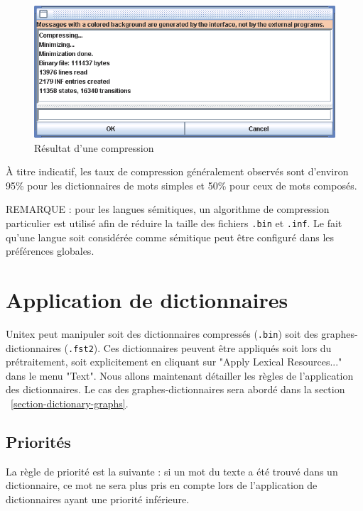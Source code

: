 \bigskip
\begin{figure}[!h]
\begin{center}
\includegraphics[width=14cm]{resources/img/fig3-11.png}
\caption{Résultat d’une compression\label{fig-compression-result}}
\end{center}
\end{figure}

\bigskip
\noindent À titre indicatif, les taux de compression généralement observés sont d’environ 95\% pour
les dictionnaires de mots simples et 50\% pour ceux de mots composés.


\bigskip
\noindent REMARQUE : pour les langues sémitiques, un algorithme de compression particulier est utilisé
afin de réduire la taille des fichiers \verb+.bin+ et \verb+.inf+. Le fait qu'une langue soit
considérée comme sémitique peut être configuré dans les préférences globales.


\section{Application de dictionnaires}
\label{section-applying-dictionaries}

\bigskip
\noindent Unitex peut manipuler soit des dictionnaires compressés (\verb+.bin+) soit des graphes-dictionnaires (\verb+.fst2+). Ces dictionnaires peuvent être appliqués soit lors du prétraitement,
soit explicitement en cliquant sur "Apply Lexical Resources..." dans le menu "Text". Nous allons
maintenant détailler les règles de l’application des dictionnaires. Le cas des graphes-dictionnaires
sera abordé dans la section ~\ref{section-dictionary-graphs}.

\subsection{Priorités}
\label{section-dictionary-priorities}
La règle de priorité est la suivante : si un mot du texte a été trouvé dans un dictionnaire,
ce mot ne sera plus pris en compte lors de l’application de dictionnaires ayant une priorité
inférieure.


